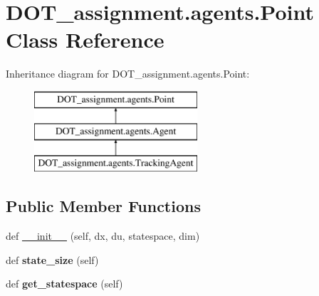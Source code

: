 \hypertarget{class_d_o_t__assignment_1_1agents_1_1_point}{}\section{D\+O\+T\+\_\+assignment.\+agents.\+Point Class Reference}
\label{class_d_o_t__assignment_1_1agents_1_1_point}
Inheritance diagram for D\+O\+T\+\_\+assignment.\+agents.\+Point\+:\begin{figure}[H]
\begin{center}
\leavevmode
\includegraphics[height=3.000000cm]{class_d_o_t__assignment_1_1agents_1_1_point}
\end{center}
\end{figure}
\subsection*{Public Member Functions}
\begin{DoxyCompactItemize}
\item 
def \mbox{\hyperlink{class_d_o_t__assignment_1_1agents_1_1_point_aa87b4bca83a6edd4a6e153cd5717d5e2}{\+\_\+\+\_\+init\+\_\+\+\_\+}} (self, dx, du, statespace, dim)
\item 
\mbox{\label{class_d_o_t__assignment_1_1agents_1_1_point_a2a14d6d27f3769503b8d8a7f1d178f94}} 
def {\bfseries state\+\_\+size} (self)
\item 
\mbox{\label{class_d_o_t__assignment_1_1agents_1_1_point_abc62eb50e5be2c88582d5a83ec12a5c4}} 
def {\bfseries get\+\_\+statespace} (self)
\end{DoxyCompactItemize}

